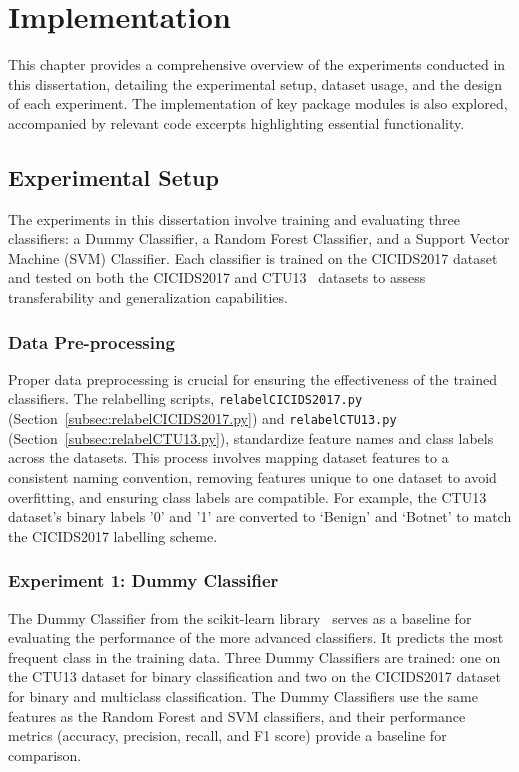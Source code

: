 \chapter{Implementation}

This chapter provides a comprehensive overview of the experiments conducted in this dissertation, detailing the experimental setup, dataset usage, and the design of each experiment. The implementation of key package modules is also explored, accompanied by relevant code excerpts highlighting essential functionality.

\section{Experimental Setup}\label{sec:experimental-setup}

The experiments in this dissertation involve training and evaluating three classifiers: a Dummy Classifier, a Random Forest Classifier, and a Support Vector Machine (SVM) Classifier. Each classifier is trained on the CICIDS2017 dataset~\cite{sharafaldin2018toward} and tested on both the CICIDS2017 and CTU13~\cite{garcia2014empirical} datasets to assess transferability and generalization capabilities.

\subsection{Data Pre-processing}\label{subsec:pre-processing}

Proper data preprocessing is crucial for ensuring the effectiveness of the trained classifiers. The relabelling scripts, \texttt{relabelCICIDS2017.py} (Section~\ref{subsec:relabelCICIDS2017.py}) and \texttt{relabelCTU13.py} (Section~\ref{subsec:relabelCTU13.py}), standardize feature names and class labels across the datasets. This process involves mapping dataset features to a consistent naming convention, removing features unique to one dataset to avoid overfitting, and ensuring class labels are compatible. For example, the CTU13 dataset's binary labels '0' and '1' are converted to `Benign' and `Botnet' to match the CICIDS2017 labelling scheme.

\subsection{Experiment 1: Dummy Classifier}\label{subsec:baseline-performance}

The Dummy Classifier from the scikit-learn library~\cite{pedregosa2011scikit} serves as a baseline for evaluating the performance of the more advanced classifiers. It predicts the most frequent class in the training data. Three Dummy Classifiers are trained: one on the CTU13 dataset for binary classification and two on the CICIDS2017 dataset for binary and multiclass classification. The Dummy Classifiers use the same features as the Random Forest and SVM classifiers, and their performance metrics (accuracy, precision, recall, and F1 score) provide a baseline for comparison.

